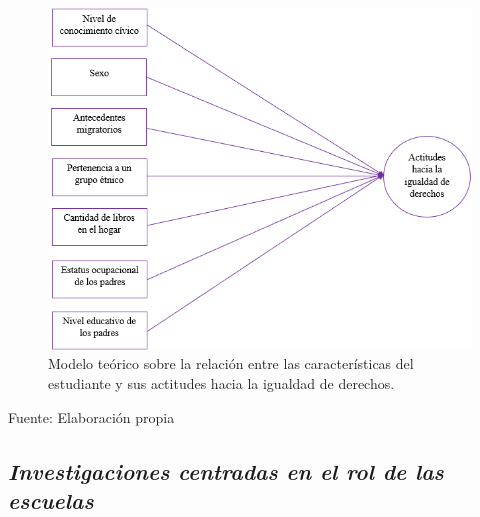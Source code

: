 \documentclass[12pt,twoside]{templates/facsothesis}
\begin{document}
\begin{figure}

{\centering \includegraphics[width=0.9\linewidth]{input/images/modelo_1} 

}

\caption{Modelo teórico sobre la relación entre las características del estudiante y sus actitudes hacia la igualdad de derechos.}\label{fig:unnamed-chunk-2}
\end{figure}

\begin{center}
Fuente: Elaboración propia 

\end{center}

\hypertarget{investigaciones-centradas-en-el-rol-de-las-escuelas}{%
\subsection{\texorpdfstring{\emph{Investigaciones centradas en el rol de las escuelas}}{Investigaciones centradas en el rol de las escuelas}}\label{investigaciones-centradas-en-el-rol-de-las-escuelas}}
\end{document}
